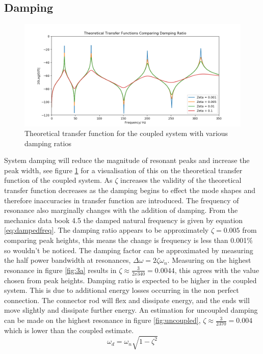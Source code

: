 \documentclass[twoside,onecolumn]{article}
\begin{document}
\subsection{Damping}
\begin{figure}[!htb]
  \centering
    \includegraphics[width=\linewidth]{zetacomp}
  \caption{Theoretical transfer function for the coupled system with various damping ratios}
  \label{fig:zetacomp}
\end{figure}
System damping will reduce the magnitude of resonant peaks and increase the peak width, see figure \ref{fig:zetacomp} for a visualisation of this on the theoretical transfer function of the coupled system. As $\zeta$ increases the validity of the theoretical transfer function decreases as the damping begins to effect the mode shapes and therefore inaccuracies in transfer function are introduced. The frequency of resonance also marginally changes with the addition of damping. From the mechanics data book 4.5 the damped natural frequency is given by equation \ref{eq:dampedfreq}. The damping ratio appears to be approximately $\zeta=0.005$ from comparing peak heights, this means the change is frequency is less than 0.001\% so wouldn't be noticed. The damping factor can be approximated by measuring the half power bandwidth at resonances, $\Delta \omega = 2 \zeta \omega_n$. Measuring on the highest resonance in figure \ref{fig:3a} results in $\zeta \approx \frac{3}{2x340} = 0.0044$, this agrees with the value chosen from peak heights.
Damping ratio is expected to be higher in the coupled system. This is due to additional energy losses occurring in the non perfect connection. The connector rod will flex and dissipate energy, and the ends will move slightly and dissipate further energy. An estimation for uncoupled damping can be made on the highest resonance in figure \ref{fig:uncoupled}, $\zeta \approx \frac{3}{2370} = 0.004$ which is lower than the coupled estimate.
\begin{equation}
\omega_d=\omega_n\sqrt{1-\zeta^2}
\label{eq:dampedfreq}
\end{equation}
\end{document}
